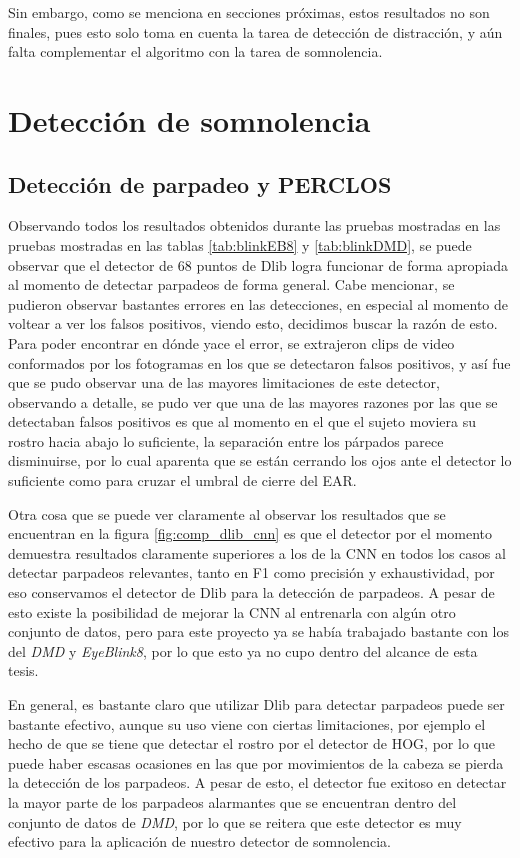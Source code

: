 Sin embargo, como se menciona en secciones próximas, estos resultados no son finales, pues esto solo toma en cuenta la tarea de detección de distracción, y aún falta complementar el algoritmo con la tarea de somnolencia. 
\section{Detección de somnolencia}
\subsection{Detección de parpadeo y PERCLOS}

Observando todos los resultados obtenidos durante las pruebas mostradas en las pruebas mostradas en las tablas \ref{tab:blinkEB8} y \ref{tab:blinkDMD}, se puede observar que el detector de 68 puntos de Dlib logra funcionar de forma apropiada al momento de detectar parpadeos de forma general. Cabe mencionar, se pudieron observar bastantes errores en las detecciones, en especial al momento de voltear a ver los falsos positivos, viendo esto, decidimos buscar la razón de esto. Para poder encontrar en dónde yace el error, se extrajeron clips de video conformados por los fotogramas en los que se detectaron falsos positivos, y así fue que se pudo observar una de las mayores limitaciones de este detector, observando a detalle, se pudo ver que una de las mayores razones por las que se detectaban falsos positivos es que al momento en el que el sujeto moviera su rostro hacia abajo lo suficiente, la separación entre los párpados parece disminuirse, por lo cual aparenta que se están cerrando los ojos ante el detector lo suficiente como para cruzar el umbral de cierre del EAR.

Otra cosa que se puede ver claramente al observar los resultados que se encuentran en la figura \ref{fig:comp_dlib_cnn} es que el detector por el momento demuestra resultados claramente superiores a los de la CNN en todos los casos al detectar parpadeos relevantes, tanto en F1 como precisión y exhaustividad, por eso conservamos el detector de Dlib para la detección de parpadeos. A pesar de esto existe la posibilidad de mejorar la CNN al entrenarla con algún otro conjunto de datos, pero para este proyecto ya se había trabajado bastante con los del \textit{DMD} y \textit{EyeBlink8}, por lo que esto ya no cupo dentro del alcance de esta tesis.

En general, es bastante claro que utilizar Dlib para detectar parpadeos puede ser bastante efectivo, aunque su uso viene con ciertas limitaciones, por ejemplo el hecho de que se tiene que detectar el rostro por el detector de HOG, por lo que puede haber escasas ocasiones en las que por movimientos de la cabeza se pierda la detección de los parpadeos. A pesar de esto, el detector fue exitoso en detectar la mayor parte de los parpadeos alarmantes que se encuentran dentro del conjunto de datos de \textit{DMD}, por lo que se reitera que este detector es muy efectivo para la aplicación de nuestro detector de somnolencia.

